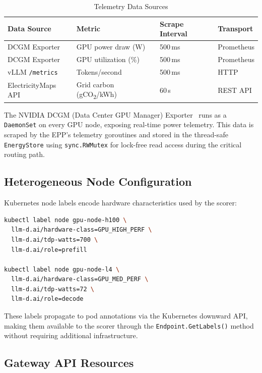 \begin{table}[htbp]
\centering
\caption{Telemetry Data Sources}
\label{tab:telemetry-sources}
\begin{tabular}{llll}
\toprule
\textbf{Data Source} & \textbf{Metric} & \textbf{Scrape Interval} & \textbf{Transport} \\
\midrule
DCGM Exporter & GPU power draw (W) & 500\,ms & Prometheus \\
DCGM Exporter & GPU utilization (\%) & 500\,ms & Prometheus \\
vLLM \texttt{/metrics} & Tokens/second & 500\,ms & HTTP \\
ElectricityMaps API & Grid carbon (gCO\textsubscript{2}/kWh) & 60\,s & REST API \\
\bottomrule
\end{tabular}
\end{table}

The NVIDIA DCGM (Data Center GPU Manager) Exporter~\cite{dcgm-exporter} runs as a \texttt{DaemonSet} on every GPU node, exposing real-time power telemetry. This data is scraped by the EPP's telemetry goroutines and stored in the thread-safe \texttt{EnergyStore} using \texttt{sync.RWMutex} for lock-free read access during the critical routing path.

\subsection{Heterogeneous Node Configuration}
\label{subsec:node-config}

Kubernetes node labels encode hardware characteristics used by the scorer:

\begin{lstlisting}[language=bash, caption={Node labeling for heterogeneous hardware}, label={lst:node-labels}]
kubectl label node gpu-node-h100 \
  llm-d.ai/hardware-class=GPU_HIGH_PERF \
  llm-d.ai/tdp-watts=700 \
  llm-d.ai/role=prefill

kubectl label node gpu-node-l4 \
  llm-d.ai/hardware-class=GPU_MED_PERF \
  llm-d.ai/tdp-watts=72 \
  llm-d.ai/role=decode
\end{lstlisting}

These labels propagate to pod annotations via the Kubernetes downward API, making them available to the scorer through the \texttt{Endpoint.GetLabels()} method without requiring additional infrastructure.

\subsection{Gateway API Resources}
\label{subsec:gateway-resources}

